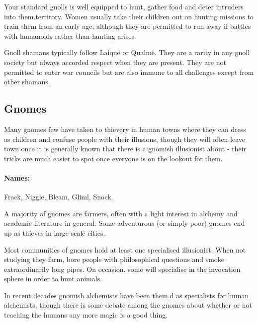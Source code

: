\begin{multicols}{2}
\label{gnoll_hunter}

Your standard gnolls is well equipped to hunt, gather food and deter intruders into them.territory.  Women usually take their children out on hunting missions to train them from an early age, although they are permitted to run away if battles with humanoids rather than hunting arises.


\gnollhunter

\columnbreak

\label{gnoll_shaman}

Gnoll shamans typically follow Laiqu\"{e} or Qualm\"{e}.  They are a rarity in any gnoll society but always accorded respect when they are present.  They are not permitted to enter war councils but are also immune to all challenges except from other shamans.

\gnollshaman 

\subsection{Gnomes}

Many gnomes few have taken to thievery in human towns where they can dress as children and confuse people with their illusions, though they will often leave town once it is generally known that there is a gnomish illusionist about - their tricks are much easier to spot once everyone is on the lookout for them.

\paragraph{Names:} Frack, Niggle, Bleam, Gliml, Snock.

\label{gnomish_citizen}
\gnome

A majority of gnomes are farmers, often with a light interest in alchemy and academic literature in general.  Some adventurous (or simply poor) gnomes end up as thieves in large-scale cities.

\label{gnomish_illusionist}

Most communities of gnomes hold at least one specialised illusionist.  When not studying they farm, bore people with philosophical questions and smoke extraordinarily long pipes.  On occasion, some will specialise in the invocation sphere in order to hunt animals.

	In recent decades gnomish alchemists have been them.d as specialists for human alchemists, though there is some debate among the gnomes about whether or not teaching the humans any more magic is a good thing.


\end{multicols}
